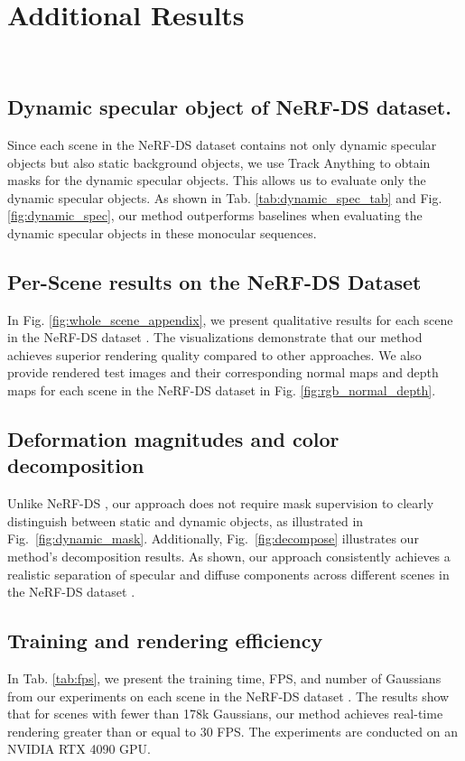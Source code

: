 \section{Additional Results}~\label{sec:result}
\subsection{Dynamic specular object of NeRF-DS dataset.}


Since each scene in the NeRF-DS dataset \citep{yan2023nerf} contains not only dynamic specular objects but also static background objects, we use Track Anything \citep{yang2023track} to obtain masks for the dynamic specular objects. This allows us to evaluate only the dynamic specular objects. As shown in Tab. \ref{tab:dynamic_spec_tab} and Fig. \ref{fig:dynamic_spec}, our method outperforms baselines when evaluating the dynamic specular objects in these monocular sequences.

\subsection{Per-Scene results on the NeRF-DS Dataset}


In Fig. \ref{fig:whole_scene_appendix}, we present qualitative results for each scene in the NeRF-DS dataset \citep{yan2023nerf}. The visualizations demonstrate that our method achieves superior rendering quality compared to other approaches. We also provide rendered test images and their corresponding normal maps and depth maps for each scene in the NeRF-DS dataset in Fig. \ref{fig:rgb_normal_depth}. 


\subsection{Deformation magnitudes and color decomposition}


Unlike NeRF-DS \citep{yan2023nerf}, our approach does not require mask supervision to clearly distinguish between static and dynamic objects, as illustrated in Fig.~\ref{fig:dynamic_mask}. Additionally, Fig.~\ref{fig:decompose} illustrates our method's decomposition results. As shown, our approach consistently achieves a realistic separation of specular and diffuse components across different scenes in the NeRF-DS dataset \citep{yan2023nerf}.

\subsection{Training and rendering efficiency} 

In Tab. \ref{tab:fps}, we present the training time, FPS, and number of Gaussians from our experiments on each scene in the NeRF-DS dataset \citep{yan2023nerf}. The results show that for scenes with fewer than 178k Gaussians, our method achieves real-time rendering greater than or equal to 30 FPS. The experiments are conducted on an NVIDIA RTX 4090 GPU.


